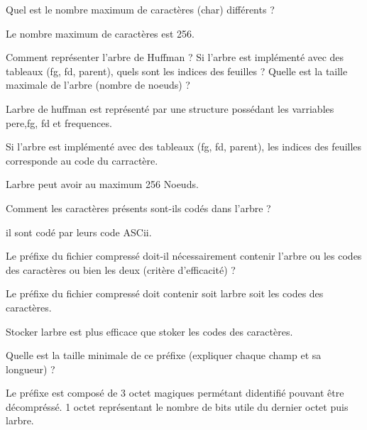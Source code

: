 \begin{DoxyItemize}
\item Quel est le nombre maximum de caractères (char) différents ?
\begin{DoxyItemize}
\item Le nombre maximum de caractères est 256.
\end{DoxyItemize}
\item Comment représenter l’arbre de Huffman ? Si l’arbre est implémenté avec des tableaux (fg, fd, parent), quels sont les indices des feuilles ? Quelle est la taille maximale de l’arbre (nombre de noeuds) ?
\begin{DoxyItemize}
\item L\textquotesingle{}arbre de huffman est représenté par une structure possédant les varriables {\ttfamily pere},{\ttfamily fg}, {\ttfamily fd} et {\ttfamily frequences}.
\item Si l’arbre est implémenté avec des tableaux (fg, fd, parent), les indices des feuilles corresponde au code du carractère.
\item L\textquotesingle{}arbre peut avoir au maximum 256 Noeuds.
\end{DoxyItemize}
\item Comment les caractères présents sont-\/ils codés dans l’arbre ?
\begin{DoxyItemize}
\item il sont codé par leurs code A\+S\+Cii.
\end{DoxyItemize}
\item Le préfixe du fichier compressé doit-\/il nécessairement contenir l’arbre ou les codes des caractères ou bien les deux (critère d’efficacité) ?
\begin{DoxyItemize}
\item Le préfixe du fichier compressé doit contenir soit l\textquotesingle{}arbre soit les codes des caractères.
\item Stocker l\textquotesingle{}arbre est plus efficace que stoker les codes des caractères.
\end{DoxyItemize}
\item Quelle est la taille minimale de ce préfixe (expliquer chaque champ et sa longueur) ?
\begin{DoxyItemize}
\item Le préfixe est composé de 3 octet magiques permétant d\textquotesingle{}identifié pouvant être décompréssé. 1 octet représentant le nombre de bits utile du dernier octet puis l\textquotesingle{}arbre.
\end{DoxyItemize}

\end{DoxyItemize}
